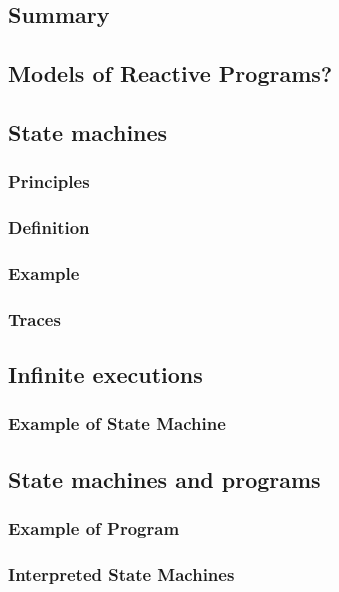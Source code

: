 \documentclass[12pt, a4paper]{book}
\begin{document}
  \subsection{Summary}
  \label{sub:Summary}
  \subsection{Models of Reactive Programs?}
  \label{sub:Models of Reactive Programs?}
  \subsection{State machines}
  \label{sub:State machines}
  \subsubsection{Principles}
  \label{subs:Principles}
  \subsubsection{Definition}
  \label{subs:Definition}
  \subsubsection{Example}
  \label{subs:Example}
  \subsubsection{Traces}
  \label{subs:Traces}
  \subsection{Infinite executions}
  \label{sub:Infinite executions}
  \subsubsection{Example of State Machine}
  \label{subs:Example of State Machine}
  \subsection{State machines and programs}
  \label{sub:State machines and programs}
  \subsubsection{Example of Program}
  \label{subs:Example of Program}
  \subsubsection{Interpreted State Machines}
  \label{subs:Interpreted State Machines}
\end{document}
